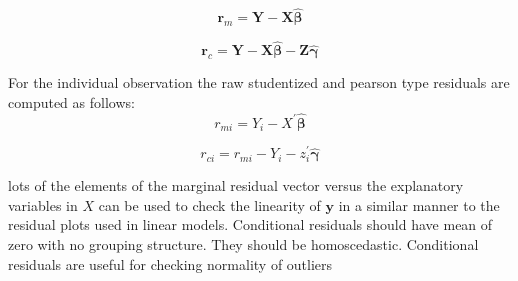 \documentclass[12pt, a4paper]{report}
\theoremstyle{plain}
\theoremstyle{definition}
\theoremstyle{remark}
\begin{document}
\[\boldsymbol{r}_{m} = \boldsymbol{Y} -  \boldsymbol{X} \boldsymbol{\hat{\beta}} \]

\[\boldsymbol{r}_{c} = \boldsymbol{Y} -  \boldsymbol{X} \boldsymbol{\hat{\beta}} -  \boldsymbol{Z} \boldsymbol{\hat{\gamma}}\]

For the individual observation the raw studentized and pearson type residuals are computed as follows:
\[r_{mi} =Y_{i} -X^{\prime} \boldsymbol{\hat{\beta}}\]

\[r_{ci} = r_{mi} - Y_{i} - z_{i}^{\prime} \boldsymbol{\hat{\gamma}}\]











%
%
%
%










lots of the elements of the marginal residual vector versus the explanatory variables in $X$ can be used to check the linearity of $\boldsymbol{y}$ in a similar manner to the residual plots used in linear models.	Conditional residuals should have mean of zero with no grouping structure. They should be homoscedastic. Conditional residuals are useful for checking normality of outliers

\end{document}
